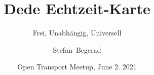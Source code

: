 


\usepackage{hyperref}

\usebackgroundtemplate

\usepackage{tikz}

\title[Dede]%
{Dede Echtzeit-Karte}

\subtitle{Frei, Unabhängig, Universell}

\author[Begerad]%
{Stefan~Begerad}

\date[OTM, 6.2.2021]%
{Open Transport Meetup, June 2. 2021}
